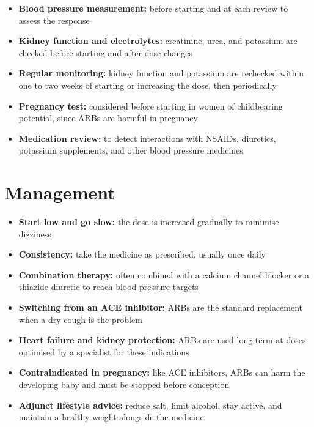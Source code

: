 \begin{itemize}
    \item \textbf{Blood pressure measurement:} before starting and at each review to assess the response
    \item \textbf{Kidney function and electrolytes:} creatinine, urea, and potassium are checked before starting and after dose changes
    \item \textbf{Regular monitoring:} kidney function and potassium are rechecked within one to two weeks of starting or increasing the dose, then periodically
    \item \textbf{Pregnancy test:} considered before starting in women of childbearing potential, since ARBs are harmful in pregnancy
    \item \textbf{Medication review:} to detect interactions with NSAIDs, diuretics, potassium supplements, and other blood pressure medicines
\end{itemize}

\section*{Management}
\begin{itemize}
    \item \textbf{Start low and go slow:} the dose is increased gradually to minimise dizziness
    \item \textbf{Consistency:} take the medicine as prescribed, usually once daily
    \item \textbf{Combination therapy:} often combined with a calcium channel blocker or a thiazide diuretic to reach blood pressure targets
    \item \textbf{Switching from an ACE inhibitor:} ARBs are the standard replacement when a dry cough is the problem
    \item \textbf{Heart failure and kidney protection:} ARBs are used long-term at doses optimised by a specialist for these indications
    \item \textbf{Contraindicated in pregnancy:} like ACE inhibitors, ARBs can harm the developing baby and must be stopped before conception
    \item \textbf{Adjunct lifestyle advice:} reduce salt, limit alcohol, stay active, and maintain a healthy weight alongside the medicine
\end{itemize}

